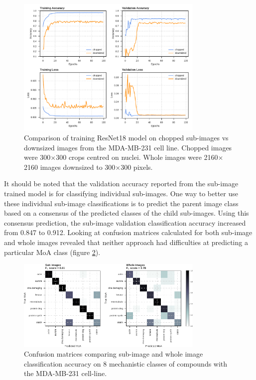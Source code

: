 \documentclass[a4paper,11pt,twoside,openright]{scrbook}
\begin{document}
\begin{figure}
    \includegraphics[width=0.8\textwidth]{ch2choppedVsWhole}
    \captionsetup{width=0.8\textwidth}
    \caption[Comparison of whole images vs sub-images]{
Comparison of training ResNet18 model on chopped sub-images vs downsized images from the MDA-MB-231 cell line.
Chopped images were 300$\times$300 crops centred on nuclei.
Whole images were 2160$\times$2160 images downsized to 300$\times$300 pixels.
}
    \label{figure:nn_chopped_vs_whole_curves}
\end{figure}


It should be noted that the validation accuracy reported from the sub-image trained model is for classifying individual sub-images.
One way to better use these individual sub-image classifications is to predict the parent image class based on a consensus of the predicted classes of the child sub-images.
Using this consensus prediction, the sub-image validation classification accuracy increased from 0.847 to 0.912.
Looking at confusion matrices calculated for both sub-image and whole images revealed that neither approach had difficulties at predicting a particular MoA class (figure \ref{figure:nn_chopped_vs_whole_cm}).


\begin{figure}
    \includegraphics[width=0.8\textwidth]{ch2choppedWholeCM}
    \captionsetup{width=0.8\textwidth}
    \caption[Sub image and whole image confusion matrices]{
Confusion matrices comparing sub-image and whole image classification accuracy on 8 mechanistic classes of compounds with the MDA-MB-231 cell-line.
}
    \label{figure:nn_chopped_vs_whole_cm}
\end{figure}
\end{document}
